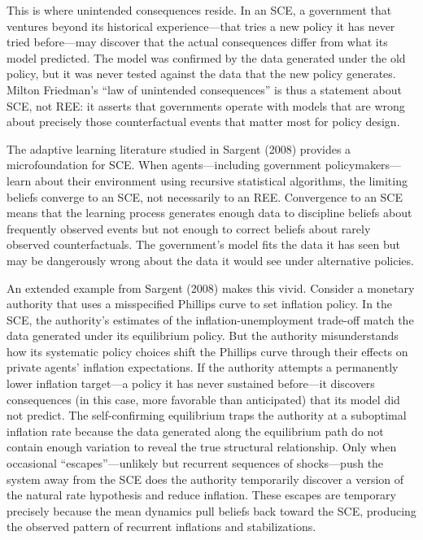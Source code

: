 \documentclass[12pt]{article}
\begin{document}
This is where unintended consequences reside. In an SCE, a government that ventures beyond its historical experience---that tries a new policy it has never tried before---may discover that the actual consequences differ from what its model predicted. The model was confirmed by the data generated under the old policy, but it was never tested against the data that the new policy generates. Milton Friedman's ``law of unintended consequences'' is thus a statement about SCE, not REE: it asserts that governments operate with models that are wrong about precisely those counterfactual events that matter most for policy design.

The adaptive learning literature studied in Sargent (2008) provides a microfoundation for SCE. When agents---including government policymakers---learn about their environment using recursive statistical algorithms, the limiting beliefs converge to an SCE, not necessarily to an REE. Convergence to an SCE means that the learning process generates enough data to discipline beliefs about frequently observed events but not enough to correct beliefs about rarely observed counterfactuals. The government's model fits the data it has seen but may be dangerously wrong about the data it would see under alternative policies.

An extended example from Sargent (2008) makes this vivid. Consider a monetary authority that uses a misspecified Phillips curve to set inflation policy. In the SCE, the authority's estimates of the inflation-unemployment trade-off match the data generated under its  equilibrium policy. But the authority misunderstands how its systematic policy choices shift the Phillips curve through their effects on private agents' inflation expectations. If the authority attempts a permanently lower inflation target---a policy it has never sustained before---it discovers consequences (in this case, more favorable than anticipated) that its model did not predict. The self-confirming equilibrium traps the authority at a suboptimal inflation rate  because the data generated along the equilibrium path do not contain enough variation to reveal the true structural relationship. Only when occasional ``escapes''---unlikely but recurrent sequences of shocks---push the system away from the SCE does the authority temporarily discover a version of the natural rate hypothesis and reduce inflation. These escapes are  temporary precisely because the mean dynamics pull beliefs back toward the SCE, producing the observed pattern of recurrent inflations and stabilizations.
\end{document}
